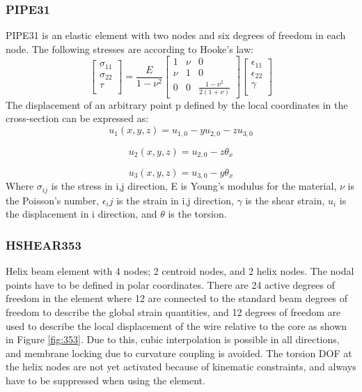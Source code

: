 \subsubsection{PIPE31}
PIPE31 is an elastic element with two nodes and six degrees of freedom in each node. The following stresses are according to Hooke's law:
\begin{equation}
    \begin{bmatrix}
       \sigma_{11}\\[0.3em]
       \sigma_{22}\\[0.3em]
        \tau\\[0.3em]
     \end{bmatrix}= \frac{E}{1-\nu^2}  \begin{bmatrix}
       1 & \nu & 0           \\[0.3em]
       \nu & 1      & 0 \\[0.3em]
       0           & 0& \frac{1-\nu^2}{2(1+\nu)}
     \end{bmatrix} \begin{bmatrix}
       \epsilon_{11}\\[0.3em]
       \epsilon_{22}\\[0.3em]
        \gamma\\[0.3em]
     \end{bmatrix}
\end{equation}
The displacement of an arbitrary point p defined by the local coordinates in the cross-section can be expressed as:
\begin{equation}
    u_1(x,y,z)=u_{1,0}-yu_{2,0}-zu_{3,0}
\end{equation}

\begin{equation}
    u_2(x,y,z)=u_{2,0}-z\theta_x
\end{equation}

\begin{equation}
    u_3(x,y,z)=u_{3,0}-y\theta_x
\end{equation}
\noindent Where $\sigma_{ij}$ is the stress in i,j direction, E is Young's modulus for the material, $\nu$ is the Poisson's number, $\epsilon_ij$ is the strain in i,j direction, $\gamma$ is the shear strain, $u_i$ is the displacement in i direction, and $\theta$ is the torsion.  
\subsubsection{HSHEAR353}
Helix beam element with 4 nodes; 2 centroid nodes, and 2 helix nodes. The nodal points have to be defined in polar coordinates. There are 24 active degrees of freedom in the element where 12 are connected to the standard beam degrees of freedom to describe the global strain quantities, and 12 degrees of freedom are used to describe the local displacement of the wire relative to the core as shown in Figure \ref{fig:353}. Due to this, cubic interpolation is possible in all directions, and membrane locking due to curvature coupling is avoided. The torsion DOF at the helix nodes are not yet activated because of kinematic constraints, and always have to be suppressed when using the element.


